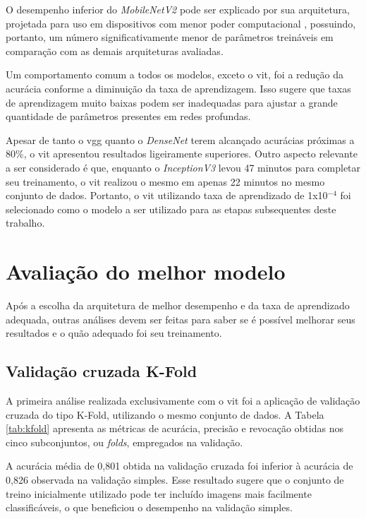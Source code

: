 O desempenho inferior do \textit{MobileNetV2} pode ser explicado por sua arquitetura, projetada para uso em dispositivos com menor poder computacional \cite{mobilenetv2}, possuindo, portanto, um número significativamente menor de parâmetros treináveis em comparação com as demais arquiteturas avaliadas.

Um comportamento comum a todos os modelos, exceto o \acrshort{vit}, foi a redução da acurácia conforme a diminuição da taxa de aprendizagem.
Isso sugere que taxas de aprendizagem muito baixas podem ser inadequadas para ajustar a grande quantidade de parâmetros presentes em redes profundas.

Apesar de tanto o \acrshort{vgg} quanto o \textit{DenseNet} terem alcançado acurácias próximas a 80\%, o \acrshort{vit} apresentou resultados ligeiramente superiores.
Outro aspecto relevante a ser considerado é que, enquanto o \textit{InceptionV3} levou 47 minutos para completar seu treinamento, o \acrshort{vit} realizou o mesmo em apenas 22 minutos no mesmo conjunto de dados.
Portanto, o \acrshort{vit} utilizando taxa de aprendizado de 1x10$^{-4}$ foi selecionado como o modelo a ser utilizado para as etapas subsequentes deste trabalho.

\section{Avaliação do melhor modelo}\label{sec:bestmodel}

Após a escolha da arquitetura de melhor desempenho e da taxa de aprendizado adequada, outras análises devem ser feitas para saber se é possível melhorar seus resultados e o quão adequado foi seu treinamento.


\subsection{Validação cruzada K-Fold}

A primeira análise realizada exclusivamente com o \acrshort{vit} foi a aplicação de validação cruzada do tipo K-Fold, utilizando o mesmo conjunto de dados.
A Tabela \ref{tab:kfold} apresenta as métricas de acurácia, precisão e revocação obtidas nos cinco subconjuntos, ou \textit{folds}, empregados na validação.

A acurácia média de 0,801 obtida na validação cruzada foi inferior à acurácia de 0,826 observada na validação simples.
Esse resultado sugere que o conjunto de treino inicialmente utilizado pode ter incluído imagens mais facilmente classificáveis, o que beneficiou o desempenho na validação simples.

